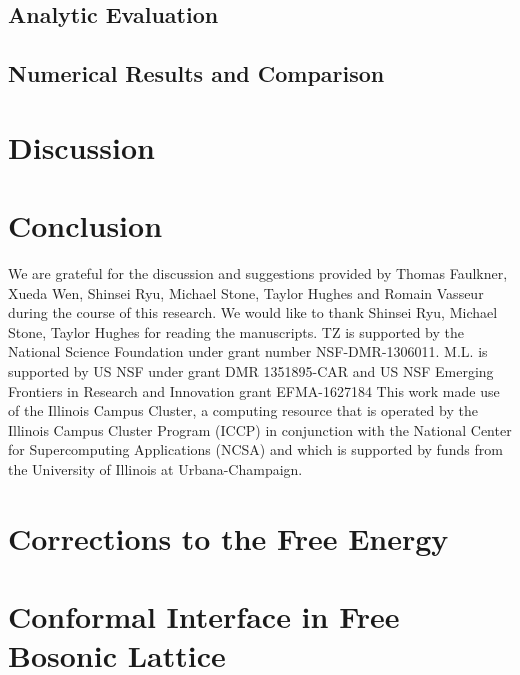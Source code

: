 \documentclass[reprint, prb]{revtex4-1}
\begin{document}
\subsection{Analytic Evaluation}
\label{sec_sub:analy_eval}


\subsection{Numerical Results and Comparison}


\section{Discussion}
\label{sec:disc}


\section{Conclusion}
\label{sec:conclusion}



\begin{acknowledgments}
We are grateful for the discussion and suggestions provided by Thomas Faulkner, Xueda Wen, Shinsei Ryu, Michael Stone, Taylor Hughes and Romain Vasseur during the course of this research. We would like to thank Shinsei Ryu, Michael Stone, Taylor Hughes for reading the manuscripts. 
TZ is supported by the National Science Foundation under grant number NSF-DMR-1306011.
M.L. is supported by US NSF under grant DMR 1351895-CAR and US NSF Emerging Frontiers in Research and Innovation grant EFMA-1627184
This work made use of the Illinois Campus Cluster, a computing resource that is operated by the Illinois Campus Cluster Program (ICCP) in conjunction with the National Center for Supercomputing Applications (NCSA) and which is supported by funds from the University of Illinois at Urbana-Champaign.
\end{acknowledgments}

\appendix
\section{Corrections to the Free Energy}
\label{app:F_correction}


\section{Conformal Interface in Free Bosonic Lattice}
\label{app:interface_free_boson}

\end{document}
